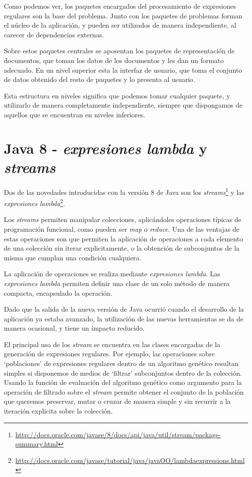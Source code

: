 
Como podemos ver, los paquetes encargados del procesamiento de expresiones regulares son la base del problema.
Junto con los paquetes de problemas forman el núcleo de la aplicación, y pueden ser utilizados de manera independiente, al carecer de dependencias externas.

Sobre estos paquetes centrales se aposentan los paquetes de representación de documentos, que toman los datos de los documentos y les dan un formato adecuado.
En un nivel superior esta la interfaz de usuario, que toma el conjunto de datos obtenido del resto de paquetes y lo presenta al usuario.

Esta estructura en niveles significa que podemos tomar cualquier paquete, y utilizarlo de manera completamente independiente, siempre que dispongamos de aquellos que se encuentran en niveles inferiores.

\section{Java 8 - \emph{expresiones lambda} y \emph{streams}}
Dos de las novedades introducidas con la versión 8 de Java son los \emph{streams}\footnote{\url{http://docs.oracle.com/javase/8/docs/api/java/util/stream/package-summary.html}} y las \emph{expresiones lambda}\footnote{\url{http://docs.oracle.com/javase/tutorial/java/javaOO/lambdaexpressions.html}}.

Los \emph{streams} permiten manipular colecciones, aplicándoles operaciones típicas de programación funcional, como pueden ser \emph{map} o \emph{reduce}.
Una de las ventajas de estas operaciones son que permiten la aplicación de operaciones a cada elemento de una colección sin iterar explicitamente, o la obtención de subconjuntos de la misma que cumplan una condición cualquiera.

La aplicación de operaciones se realiza mediante \emph{expresiones lambda}.
Las \emph{expresiones lambda} permiten definir una clase de un solo método de manera compacta, encapsulado la operación.

Dado que la salida de la nueva versión de Java ocurrió cuando el desarrollo de la aplicación ya estaba avanzado, la utilización de las nuevas herramientas se da de manera ocasional, y tiene un impacto reducido.

El principal uso de los \emph{stream} se encuentra en las clases encargadas de la generación de expresiones regulares.
Por ejemplo, las operaciones sobre `poblaciones' de expresiones regulares dentro de un algoritmo genético resultan simples si disponemos de medios de `filtrar' subconjuntos dentro de la colección.
Usando la función de evaluación del algoritmo genético como argumento para la operación de filtrado sobre el \emph{stream} permite obtener el conjunto de la población que queremos preservar, mutar o cruzar de manera simple y sin recurrir a la iteración explicita sobre la colección.